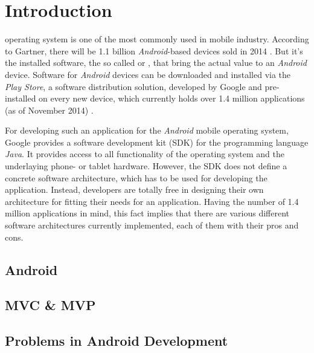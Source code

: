 \section{Introduction}

 operating system is one of the most 
commonly used in mobile industry. According to Gartner, there will be 1.1 
billion \emph{Android}-based devices sold in 2014 \cite{GartnerAndroid2014}.
But it's the installed software, the so called  or 
, that bring the actual value to an \emph{Android} device.
Software for \emph{Android} devices can be downloaded and installed via the 
\emph{Play Store}, a software distribution solution, developed by Google and 
pre-installed on every new device, which currently holds over 1.4 million 
applications (as of November 2014) \cite{AppBrainStats}.

For developing such an application for the \emph{Android} mobile operating 
system, Google provides a software development kit (SDK) for the programming 
language \emph{Java}. It provides access to all functionality of the 
operating system and the underlaying phone- or tablet hardware.
However, the SDK does not define a concrete software architecture, which has to 
be used for developing the application. Instead, developers are totally free in 
designing their own architecture for fitting their needs for an application.
Having the number of 1.4 million applications in mind, this fact implies that 
there are various different software architectures currently implemented, each 
of them with their pros and cons.


	\subsection{Android}
	
	\subsection{MVC \& MVP}
	
	\subsection{Problems in Android Development}
	
